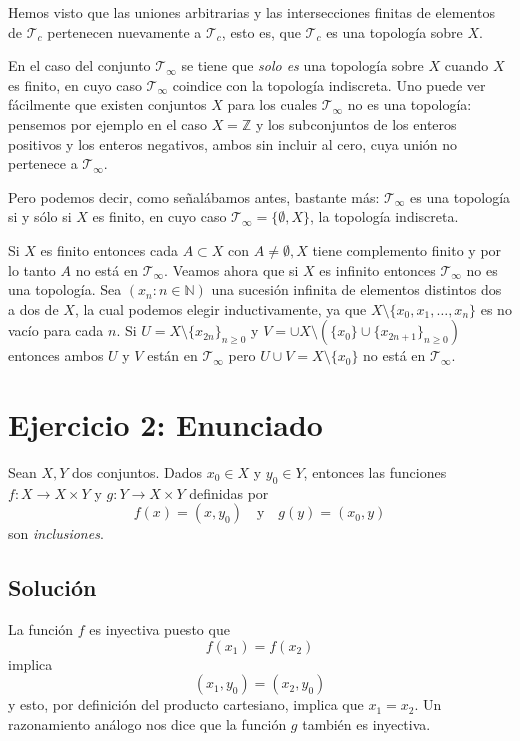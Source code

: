 \documentclass[fleqn,leqno,11pt,letterpaper,final]{article}
\begin{document}
Hemos visto que las uniones arbitrarias y las
intersecciones finitas de elementos de $\mathcal{T}_c$
pertenecen nuevamente a $\mathcal{T}_c$, esto es, que
$\mathcal{T}_c$ es una topología sobre $X$.

En el caso del conjunto $ \mathcal{T}_\infty $ se tiene
que \emph{solo es} una topología sobre $ X $ cuando
$X$ es finito, en cuyo caso $\mathcal{T}_\infty$
coindice con la topología indiscreta.
Uno puede ver fácilmente que existen conjuntos $X$
para los cuales $\mathcal{T}_\infty$ no es una
topología: pensemos por ejemplo en el caso
$X=\mathbb{Z}$ y los subconjuntos de los enteros
positivos y los enteros negativos, ambos sin incluir al
cero, cuya unión no pertenece a $\mathcal{T}_\infty$.

Pero podemos decir, como señalábamos antes, bastante
más: $\mathcal{T}_\infty$ es una topología si y sólo si $X$ es finito, en cuyo caso
$\mathcal{T}_\infty = \{\emptyset, X\}$, la topología indiscreta. 

Si $X$ es finito entonces cada $A\subset X$ con $A\not = \emptyset,X$
tiene complemento finito y por lo tanto $A$ no está en  $\mathcal{T}_\infty$.
Veamos ahora que si $X$ es infinito entonces $\mathcal{T}_\infty$ no es una topología.
Sea $(x_n\colon n\in\mathbb{N})$ una sucesión infinita de elementos distintos dos a dos de $X$, 
la cual podemos elegir inductivamente, ya que  $X \setminus \{x_0, x_1, \ldots,x_n\}$ es
no vacío para cada $n$. 
Si $U = X\setminus \{x_{2n}\}_{n\geq 0}$ y $V = \cup X \setminus (\{x_0\} \cup \{x_{2n+1}\}_{n\geq 0})$  entonces
ambos $U$ y $V$ están en  $\mathcal{T}_\infty$ pero $U\cup V = X \setminus \{x_0\}$ no está
en    $\mathcal{T}_\infty$.

\section{Ejercicio 2: Enunciado}
\hspace{-.6em}\footnotemark Sean $X,Y$ dos conjuntos. Dados $x_0\in X$ y $y_0\in Y$, entonces las funciones $f:X\to X\times Y$ y
$g: Y\to X\times Y$ definidas por
\[
f(x)=(x,y_0)\quad\text{y}\quad g(y)=(x_0,y)
\]
son \emph{inclusiones}.

\subsection{Solución}

La función $f$ es inyectiva puesto que
\[
f(x_1)=f(x_2)
\]
implica
\[
(x_1,y_0)=(x_2,y_0)
\]
y esto, por definición del producto cartesiano, implica
que $x_1=x_2$. Un razonamiento análogo nos dice que la
función $g$ también es inyectiva.
\end{document}
